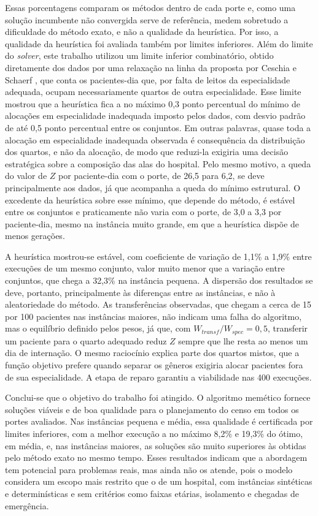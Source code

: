 Essas porcentagens comparam os métodos dentro de cada porte e, como uma solução incumbente não convergida serve de referência, medem sobretudo a dificuldade do método exato, e não a qualidade da heurística. Por isso, a qualidade da heurística foi avaliada também por limites inferiores. Além do limite do \textit{solver}, este trabalho utilizou um limite inferior combinatório, obtido diretamente dos dados por uma relaxação na linha da proposta por Ceschia e Schaerf \cite{ceschia2011local}, que conta os pacientes-dia que, por falta de leitos da especialidade adequada, ocupam necessariamente quartos de outra especialidade. Esse limite mostrou que a heurística fica a no máximo 0,3 ponto percentual do mínimo de alocações em especialidade inadequada imposto pelos dados, com desvio padrão de até 0,5 ponto percentual entre os conjuntos. Em outras palavras, quase toda a alocação em especialidade inadequada observada é consequência da distribuição dos quartos, e não da alocação, de modo que reduzi-la exigiria uma decisão estratégica sobre a composição das alas do hospital. Pelo mesmo motivo, a queda do valor de $Z$ por paciente-dia com o porte, de 26,5 para 6,2, se deve principalmente aos dados, já que acompanha a queda do mínimo estrutural. O excedente da heurística sobre esse mínimo, que depende do método, é estável entre os conjuntos e praticamente não varia com o porte, de 3,0 a 3,3 por paciente-dia, mesmo na instância muito grande, em que a heurística dispõe de menos gerações.

A heurística mostrou-se estável, com coeficiente de variação de 1,1\% a 1,9\% entre execuções de um mesmo conjunto, valor muito menor que a variação entre conjuntos, que chega a 32,3\% na instância pequena. A dispersão dos resultados se deve, portanto, principalmente às diferenças entre as instâncias, e não à aleatoriedade do método. As transferências observadas, que chegam a cerca de 15 por 100 pacientes nas instâncias maiores, não indicam uma falha do algoritmo, mas o equilíbrio definido pelos pesos, já que, com $W_{transf}/W_{spec} = 0{,}5$, transferir um paciente para o quarto adequado reduz $Z$ sempre que lhe resta ao menos um dia de internação. O mesmo raciocínio explica parte dos quartos mistos, que a função objetivo prefere quando separar os gêneros exigiria alocar pacientes fora de sua especialidade. A etapa de reparo garantiu a viabilidade nas 400 execuções.

Conclui-se que o objetivo do trabalho foi atingido. O algoritmo memético fornece soluções viáveis e de boa qualidade para o planejamento do censo em todos os portes avaliados. Nas instâncias pequena e média, essa qualidade é certificada por limites inferiores, com a melhor execução a no máximo 8,2\% e 19,3\% do ótimo, em média, e, nas instâncias maiores, as soluções são muito superiores às obtidas pelo método exato no mesmo tempo. Esses resultados indicam que a abordagem tem potencial para problemas reais, mas ainda não os atende, pois o modelo considera um escopo mais restrito que o de um hospital, com instâncias sintéticas e determinísticas e sem critérios como faixas etárias, isolamento e chegadas de emergência.

